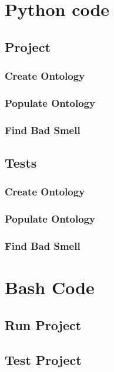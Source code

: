 \documentclass [14 pt]{article}
\begin{document}
\newpage
\appendix

\section{Python code}

\subsection{Project}
\subsubsection{Create Ontology}

\subsubsection{Populate Ontology}

\subsubsection{Find Bad Smell}


\subsection{Tests}
\subsubsection{Create Ontology}

\subsubsection{Populate Ontology}

\subsubsection{Find Bad Smell}




\section{Bash Code} 
\subsection{Run Project}

\subsection{Test Project}

\end{document}
